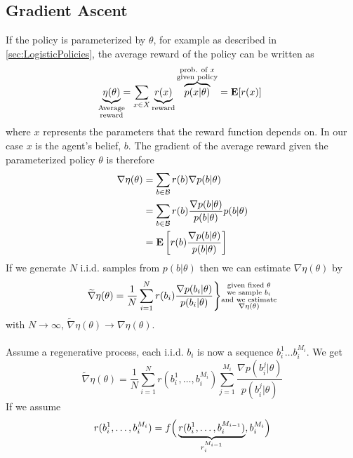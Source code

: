 \subsection{Gradient Ascent}
\label{sec:GradientAscent}
If the policy is parameterized by $\theta$, for example as described in \ref{sec:LogisticPolicies}, the average reward of the policy can be written as 
\begin{equation}
  \underbrace{\eta(\theta)}_{\mathclap{\substack{\text{Average} \\ \text{reward}}}} = \sum_{x \in X} \underbrace{r(x)}_{\text{reward}} \overbrace{p(x | \theta)}^{\substack{\text{prob. of $x$} \\ \text{given policy}}} = \Ex [r(x)]
\end{equation}
where $x$ represents the parameters that the reward function depends on. In our case $x$ is the agent's belief, $b$. The gradient of the average reward given the parameterized policy $\theta$ is therefore
\begin{align}
  \nabla \eta(\theta) &= \sum_{b \in \mathcal{B}} r(b) \nabla p(b | \theta) \\
                      &= \sum_{b \in \mathcal{B}} r(b) \frac{\nabla p(b | \theta)}{p(b | \theta)} p(b | \theta) \\
                      &= \mathop{\textbf E\/} \bigg{[}r(b) \frac{\nabla p(b | \theta)}{p(b | \theta)}\bigg{]}
\end{align}
If we generate $N$ i.i.d. samples from $p(b | \theta)$ then we can estimate $\nabla \eta(\theta)$ by
\begin{equation}
  \widetilde{\nabla} \eta(\theta) = \frac{1}{N} \sum_{i=1}^N r(b_i) \frac{\nabla p(b_i | \theta)}{p(b_i | \theta)}
  \Bigg{\}} \substack{\text{given fixed $\theta$} \\ \text{we sample $b_i$} \\ \text{and we estimate} \\ \text{$\nabla \eta(\theta)$}}
\end{equation}
with $N \to \infty$, $\widetilde{\nabla} \eta(\theta) \to \nabla \eta(\theta)$.
\\\\
Assume a regenerative process, each i.i.d. $b_i$ is now a sequence $b_i^1 \dotsc b_i^{M_i}$.
We get
\begin{equation}
  \widetilde{\nabla} \eta(\theta) = \frac{1}{N} \sum_{i=1}^N r(b_i^1, \dotsc, b_i^{M_i}) \sum_{j=1}^{M_i} \frac{\nabla p(b_i^j | \theta)}{p(b_i^j | \theta)}
\end{equation}
If we assume
\begin{equation}
  r(b_i^1, \dotsc, b_i^{M_i}) = f\Big{(} \underbrace{r(b_i^1, \dotsc, b_i^{M_{i-1}})}_{r_i^{M_{i-1}}}, b_i^{M_i}\Big{)}
\end{equation}
